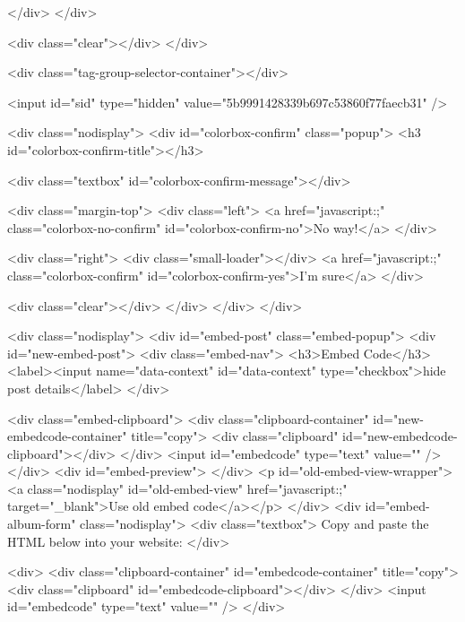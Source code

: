             
        </div>
        </div>

        <div class="clear"></div>
    </div>

    <div class="tag-group-selector-container"></div>

    <input id="sid" type="hidden" value="5b9991428339b697c53860f77faecb31" />

    <div class="nodisplay">
	<div id="colorbox-confirm" class="popup">
		<h3 id="colorbox-confirm-title"></h3>
		
		<div class="textbox" id="colorbox-confirm-message"></div>

		<div class="margin-top">
			<div class="left">
				<a href="javascript:;" class="colorbox-no-confirm" id="colorbox-confirm-no">No way!</a>
			</div>
			
			<div class="right">
				<div class="small-loader"></div>
				<a href="javascript:;" class="colorbox-confirm" id="colorbox-confirm-yes">I'm sure</a>
			</div>
			
			<div class="clear"></div>
		</div>
	</div>
</div>

    <div class="nodisplay">
    <div id="embed-post" class="embed-popup">
        <div id="new-embed-post">
            <div class="embed-nav">
                <h3>Embed Code</h3>
                <label><input name="data-context" id="data-context" type="checkbox">hide post details</label>
            </div>

            <div class="embed-clipboard">
                <div class="clipboard-container" id="new-embedcode-container" title="copy">
                    <div class="clipboard" id="new-embedcode-clipboard"></div>
                </div>
                <input id="embedcode" type="text" value="" />
            </div>
            <div id="embed-preview">
            </div>
            <p id="old-embed-view-wrapper"><a class="nodisplay" id="old-embed-view" href="javascript:;" target="_blank">Use old embed code</a></p>
        </div>
        <div id="embed-album-form" class="nodisplay">
            <div class="textbox">
                Copy and paste the HTML below into your website:
            </div>

            <div>
                <div class="clipboard-container" id="embedcode-container" title="copy">
                    <div class="clipboard" id="embedcode-clipboard"></div>
                </div>
                <input id="embedcode" type="text" value="" />
            </div>

